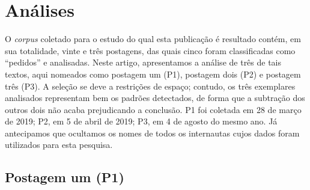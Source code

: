 \documentclass{textolivre-html}
\begin{document}
\section{Análises}\label{sec-analises}
O \textit{corpus} coletado para o estudo do qual esta publicação é resultado contém, em sua totalidade, vinte e três postagens, das quais cinco foram classificadas como “pedidos” e analisadas. Neste artigo, apresentamos a análise de três de tais textos, aqui nomeados como postagem um (P1), postagem dois (P2) e postagem três (P3). A seleção se deve a restrições de espaço; contudo, os três exemplares analisados representam bem os padrões detectados, de forma que a subtração dos outros dois não acaba prejudicando a conclusão. P1 foi coletada em 28 de março de 2019; P2, em 5 de abril de 2019; P3, em 4 de agosto do mesmo ano. Já antecipamos que ocultamos os nomes de todos os internautas cujos dados foram utilizados para esta pesquisa.

\subsection{Postagem um (P1)}\label{sec-postagem1}
\end{document}
